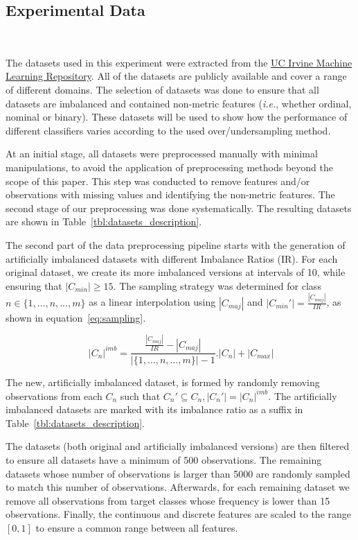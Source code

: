 \documentclass[parskip=full]{scrartcl}
\begin{document}
\subsection{Experimental Data}~\label{sec:experimental_data}

The datasets used in this experiment were extracted from the
\href{https://archive.ics.uci.edu}{UC Irvine Machine Learning Repository}. All
of the datasets are publicly available and cover a range of different domains.
The selection of datasets was done to ensure that all datasets are imbalanced
and contained non-metric features (\textit{i.e.}, whether ordinal, nominal or
binary). These datasets will be used to show how the performance of different
classifiers varies according to the used over/undersampling method.

At an initial stage, all datasets were preprocessed manually with minimal
manipulations, to avoid the application of preprocessing methods beyond the
scope of this paper. This step was conducted to remove features and/or
observations with missing values and identifying the non-metric features. The
second stage of our preprocessing was done systematically. The resulting
datasets are shown in Table~\ref{tbl:datasets_description}.



The second part of the data preprocessing pipeline starts with the generation
of artificially imbalanced datasets with different Imbalance Ratios (IR). For
each original dataset, we create its more imbalanced versions at intervals of
10, while ensuring that $|C_{min}| \ge 15$. The sampling strategy was
determined for class $n \in \{1,\ldots,n,\ldots,m\}$ as a linear interpolation using $|C_{maj}|$ and
$|C_{min}'|=\frac{|C_{maj}|}{IR}$, as shown in equation~\ref{eq:sampling}.

\begin{equation}~\label{eq:sampling}
    |C_n|^{imb} =
    \frac{\frac{|C_{maj}|}{IR}-|C_{maj}|}{|\{1,\ldots,n,\ldots,m\}|-1}.|C_n|+|C_{max}|
\end{equation}

The new, artificially imbalanced dataset, is formed by randomly removing
observations from each $C_n$ such that $C_n' \subseteq C_n , |C_n'| =
|C_n|^{imb}$. The artificially imbalanced datasets are marked with its
imbalance ratio as a suffix in Table~\ref{tbl:datasets_description}.

The datasets (both original and artificially imbalanced versions) are then
filtered to ensure all datasets have a minimum of 500 observations.  The
remaining datasets whose number of observations is larger than 5000 are
randomly sampled to match this number of observations. Afterwards, for each
remaining dataset we remove all observations from target classes whose
frequency is lower than 15 observations. Finally, the continuous and discrete
features are scaled to the range $[0,1]$ to ensure a common range between all
features. 
\end{document}
